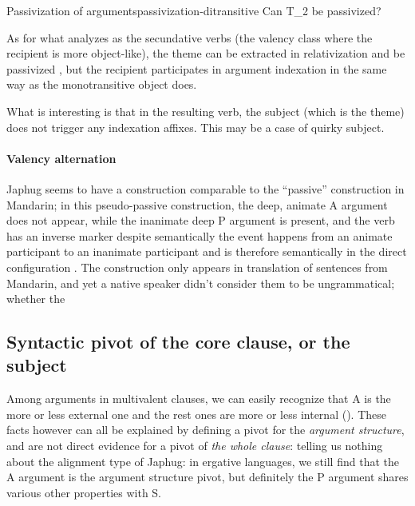 \documentclass[a4paper, oneside, 12pt]{report}
\newcommand*{\citesec}[1]{\S~{#1}}
\newcommand*{\citepage}[1]{p.~{#1}}
\newcommand*{\citepages}[1]{pp.~{#1}}
\begin{document}
\begin{todobox}{Passivization of arguments}{passivization-ditransitive}
    Can T_2 be passivized?
\end{todobox}

As for what \citet[\citesec{14.4.2}]{jacques2021grammar} analyzes as 
the secundative verbs (the valency class where the recipient is more object-like),
the theme can be extracted in relativization \citep[\citepages{581}]{jacques2021grammar}
and be passivized \citep[\citesec{18.1.4}]{jacques2021grammar},
but the recipient participates in argument indexation
in the same way as the monotransitive object does.

What is interesting is that in the resulting verb,
the subject (which is the theme) does not trigger any indexation affixes.
This may be a case of quirky subject.

\paragraph*{Valency alternation} 
Japhug seems to have a construction comparable to
the ``passive'' construction in Mandarin;
in this pseudo-passive construction,
the deep, animate A argument does not appear, 
while the inanimate deep P argument is present, 
and the verb has an inverse marker 
despite semantically the event happens 
from an animate participant to an inanimate participant
and is therefore semantically in the direct configuration
\citep[\citepage{575}]{jacques2021grammar}.
The construction only appears in translation of sentences from Mandarin,
and yet a native speaker didn't consider them to be ungrammatical;
whether the 


\subsection{Syntactic pivot of the core clause, or the subject}\label{sec:grammatical.clause.subject}

Among arguments in multivalent clauses, we can easily recognize that 
A is the more or less external one
and the rest ones are more or less internal
().
These facts however can all be explained by defining a pivot for the \emph{argument structure},
and are not direct evidence for a pivot of \emph{the whole clause}:
telling us nothing about the alignment type of Japhug:
in ergative languages, we still find that the A argument is the argument structure pivot,
but definitely the P argument shares various other properties with S.
\end{document}
